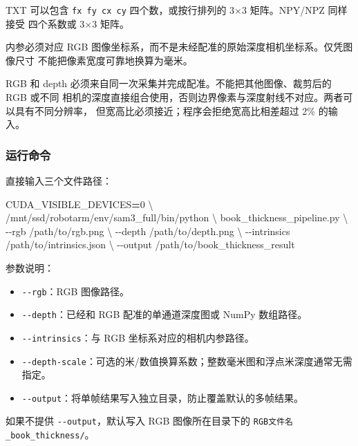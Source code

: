 \documentclass[
  chinese,
  11pt,
  a4paper,
]{article}
\newenvironment{Shaded}{\begin{snugshade}}{\end{snugshade}}
\newcommand{\AttributeTok}[1]{\textcolor[rgb]{0.13,0.29,0.53}{#1}}
\newcommand{\DataTypeTok}[1]{\textcolor[rgb]{0.13,0.29,0.53}{#1}}
\newcommand{\ExtensionTok}[1]{#1}
\newcommand{\NormalTok}[1]{#1}
\newcommand{\OperatorTok}[1]{\textcolor[rgb]{0.81,0.36,0.00}{\textbf{#1}}}
\newcommand{\VariableTok}[1]{\textcolor[rgb]{0.00,0.00,0.00}{#1}}
\providecommand{\tightlist}{%
  \setlength{\itemsep}{0pt}\setlength{\parskip}{0pt}}
\begin{document}
TXT 可以包含 \texttt{fx\ fy\ cx\ cy} 四个数，或按行排列的 3×3
矩阵。NPY/NPZ 同样接受 四个系数或 3×3 矩阵。

内参必须对应 RGB
图像坐标系，而不是未经配准的原始深度相机坐标系。仅凭图像尺寸
不能把像素宽度可靠地换算为毫米。

RGB 和 depth 必须来自同一次采集并完成配准。不能把其他图像、裁剪后的 RGB
或不同
相机的深度直接组合使用，否则边界像素与深度射线不对应。两者可以具有不同分辨率，
但宽高比必须接近；程序会拒绝宽高比相差超过 2\% 的输入。

\subsubsection{运行命令}\label{ux8fd0ux884cux547dux4ee4}

直接输入三个文件路径：

\begin{Shaded}
\begin{Highlighting}[]
\VariableTok{CUDA\_VISIBLE\_DEVICES}\OperatorTok{=}\NormalTok{0 }\DataTypeTok{\textbackslash{}}
\ExtensionTok{/mnt/ssd/robotarm/env/sam3\_full/bin/python} \DataTypeTok{\textbackslash{}}
\NormalTok{book\_thickness\_pipeline.py }\DataTypeTok{\textbackslash{}}
  \AttributeTok{{-}{-}rgb}\NormalTok{ /path/to/rgb.png }\DataTypeTok{\textbackslash{}}
  \AttributeTok{{-}{-}depth}\NormalTok{ /path/to/depth.png }\DataTypeTok{\textbackslash{}}
  \AttributeTok{{-}{-}intrinsics}\NormalTok{ /path/to/intrinsics.json }\DataTypeTok{\textbackslash{}}
  \AttributeTok{{-}{-}output}\NormalTok{ /path/to/book\_thickness\_result}
\end{Highlighting}
\end{Shaded}

参数说明：

\begin{itemize}
\tightlist
\item
  \texttt{-\/-rgb}：RGB 图像路径。
\item
  \texttt{-\/-depth}：已经和 RGB 配准的单通道深度图或 NumPy 数组路径。
\item
  \texttt{-\/-intrinsics}：与 RGB 坐标系对应的相机内参路径。
\item
  \texttt{-\/-depth-scale}：可选的米/数值换算系数；整数毫米图和浮点米深度通常无需指定。
\item
  \texttt{-\/-output}：将单帧结果写入独立目录，防止覆盖默认的多帧结果。
\end{itemize}

如果不提供 \texttt{-\/-output}，默认写入 RGB 图像所在目录下的
\texttt{RGB文件名\_book\_thickness/}。
\end{document}
